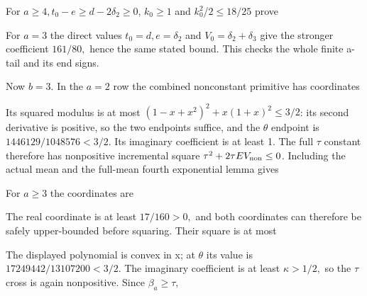 

For \(a\ge 4,\allowbreak \allowbreak   t_{0}-e\ge d-2\delta_2\ge 0\), \(k_{0}\ge 1\) and \(k_{0}^2\)/\(2\le 18/25\) prove



For \(a=3\) the direct values \(t_{0}=d,\allowbreak \allowbreak   e=\delta_2\) and \(V_{0}=\delta_2+\delta_3\) give the stronger coefficient \(161/80,\allowbreak \) hence the same stated bound. This checks the whole finite a-tail and its end signs.

Now \(b=3.\) In the \(a=2\) row the combined nonconstant primitive has coordinates



Its squared modulus is at most \((1-x+x^2)^2+x(1+x)^2\le 3/2\): its second derivative is positive, so the two endpoints suffice, and the \(\theta\) endpoint is \(1446129/1048576<3/2\). Its imaginary coefficient is at least 1. The full \(\tau\) constant therefore has nonpositive incremental square \(\tau^2+2\tau E V_{\rm non}\le 0\). Including the actual mean and the full-mean fourth exponential lemma gives



For \(a\ge 3\) the coordinates are



The real coordinate is at least \(17/160>0,\allowbreak \) and both coordinates can therefore be safely upper-bounded before squaring. Their square is at most



The displayed polynomial is convex in x; at \(\theta\) its value is \(17249442/13107200<3/2\). The imaginary coefficient is at least \(\kappa>1/2,\allowbreak \allowbreak  \) so the \(\tau\) cross is again nonpositive. Since \(\beta_a\ge \tau,\allowbreak \allowbreak  \)




